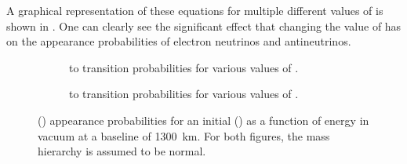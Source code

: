A graphical representation of these equations for multiple different values of \dcp is shown in .
One can clearly see the significant effect that changing the value of \dcp has on the appearance probabilities of electron neutrinos and antineutrinos.

\begin{figure}[h]
  \centering
  \begin{subfigure}[t]{0.49\textwidth}
    \begin{adjustbox}{max totalsize={\textwidth}, center}
      
    \end{adjustbox}
    \caption{\numu to \nue transition probabilities for various values of \dcp.}
  \end{subfigure}
  \hfill
  \begin{subfigure}[t]{0.49\textwidth}
    \begin{adjustbox}{max totalsize={\textwidth}, center}
      
    \end{adjustbox}
    \caption{\anumu to \anue transition probabilities for various values of \dcp.}
  \end{subfigure}
  \caption[\nue and \anue appearance probabilities in vacuum.]{\nue(\anue) appearance probabilities for an initial \numu(\anumu) as a function of energy in vacuum at a baseline of 1300~km. For both figures, the mass hierarchy is assumed to be normal.}
  \label{fig:threeNuApp}
\end{figure}

